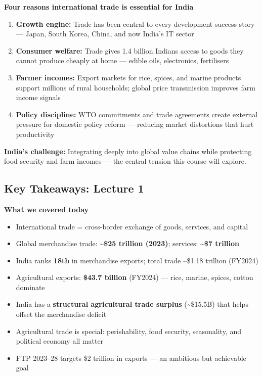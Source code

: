 \documentclass[
  letterpaper,
  DIV=11,
  numbers=noendperiod]{scrartcl}
\providecommand{\tightlist}{%
  \setlength{\itemsep}{0pt}\setlength{\parskip}{0pt}}
\begin{document}
\textbf{Four reasons international trade is essential for India}

\begin{enumerate}
\def\labelenumi{\arabic{enumi}.}
\item
  \textbf{Growth engine:} Trade has been central to every development
  success story --- Japan, South Korea, China, and now India's IT sector
\item
  \textbf{Consumer welfare:} Trade gives 1.4 billion Indians access to
  goods they cannot produce cheaply at home --- edible oils,
  electronics, fertilisers
\item
  \textbf{Farmer incomes:} Export markets for rice, spices, and marine
  products support millions of rural households; global price
  transmission improves farm income signals
\item
  \textbf{Policy discipline:} WTO commitments and trade agreements
  create external pressure for domestic policy reform --- reducing
  market distortions that hurt productivity
\end{enumerate}

\textbf{India's challenge:} Integrating deeply into global value chains
while protecting food security and farm incomes --- the central tension
this course will explore.

\subsection{Key Takeaways: Lecture 1}\label{key-takeaways-lecture-1}

\textbf{What we covered today}

\begin{itemize}
\tightlist
\item
  International trade = cross-border exchange of goods, services, and
  capital
\item
  Global merchandise trade: \textbf{\textasciitilde\$25 trillion
  (2023)}; services: \textbf{\textasciitilde\$7 trillion}
\item
  India ranks \textbf{18th} in merchandise exports; total trade
  \textasciitilde\$1.18 trillion (FY2024)
\item
  Agricultural exports: \textbf{\$43.7 billion} (FY2024) --- rice,
  marine, spices, cotton dominate
\item
  India has a \textbf{structural agricultural trade surplus}
  (\textasciitilde\$15.5B) that helps offset the merchandise deficit
\item
  Agricultural trade is special: perishability, food security,
  seasonality, and political economy all matter
\item
  FTP 2023--28 targets \$2 trillion in exports --- an ambitious but
  achievable goal
\end{itemize}
\end{document}
